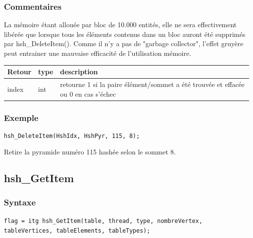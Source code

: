 \documentclass[a4paper,12pt]{article}
\begin{document}
\subsubsection*{Commentaires}
La mémoire étant allouée par bloc de 10.000 entités, elle ne sera effectivement libérée que lorsque tous les éléments contenus dans un bloc auront été supprimés par hsh\_DeleteItem().
Comme il n'y a pas de "garbage collector", l'effet gruyère peut entrainer une mauvaise efficacité de l'utilisation mémoire.

\medskip

\begin{tabular}{|m{3cm}|m{2cm}|m{8.5cm}|}
\hline
Retour     & type   & description \\
\hline
index      & int    & retourne 1 si la paire élément/sommet a été trouvée et effacée ou 0 en cas s'échec \\
\hline
\end{tabular}

\subsubsection*{Exemple}

\begin{tt}
\begin{verbatim}
hsh_DeleteItem(HshIdx, HshPyr, 115, 8);
\end{verbatim}
\end{tt}
\normalfont

Retire la pyramide numéro 115 hashée selon le sommet 8.


\subsection{hsh\_GetItem}

\subsubsection*{Syntaxe}
{\tt flag = itg hsh\_GetItem(table, thread, type, nombreVertex, tableVertices, tableElements, tableTypes);}
\end{document}
